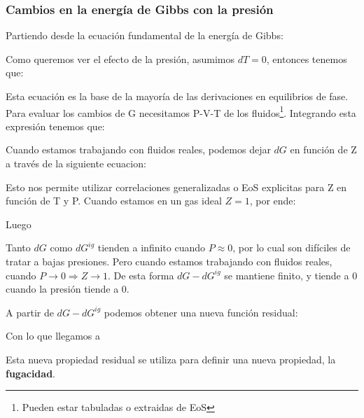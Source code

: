 \subsubsection{Cambios en la energía de Gibbs con la presión}

Partiendo desde la ecuación fundamental de la energía de Gibbs:


Como queremos ver el efecto de la presión, asumimos $dT=0$, entonces tenemos que:


Esta ecuación es la base de la mayoría de las derivaciones en equilibrios de fase. Para evaluar los cambios de G necesitamos P-V-T de los fluidos\footnote{Pueden estar tabuladas o extraidas de EoS}. Integrando esta expresión tenemos que:


Cuando estamos trabajando con fluidos reales, podemos dejar $dG$ en función de Z a través de la siguiente ecuacion:


Esto nos permite utilizar correlaciones generalizadas o EoS explicitas para Z en función de T y P. Cuando estamos en un gas ideal $Z=1$, por ende:


Luego


Tanto $dG$ como $dG^{ig}$ tienden a infinito cuando $P\approx 0$, por lo cual son difíciles de tratar a bajas presiones. Pero cuando estamos trabajando con fluidos reales, cuando $P\rightarrow 0 \Rightarrow Z\rightarrow 1$. De esta forma $dG-dG^{ig}$ se mantiene finito, y tiende a 0 cuando la presión tiende a 0.

A partir de $dG-dG^{ig}$ podemos obtener una nueva función residual:

Con lo que llegamos a


Esta nueva propiedad residual se utiliza para definir una nueva propiedad, la \textbf{fugacidad}.

